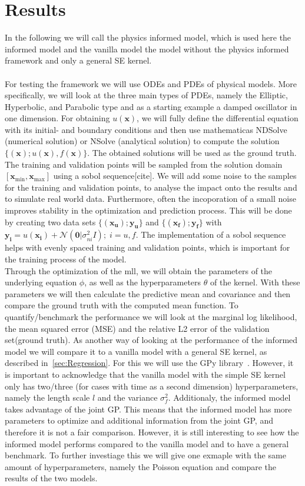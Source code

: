 \documentclass{article}
\begin{document}
\section{Results}
In the following we will call the physics informed model, which is used here the
informed model and the vanilla model the model without the physics informed
framework and only a general SE kernel.\\ \\ For testing the framework we will
use ODEs and PDEs of physical models. More specifically, we will look at the
three main types of PDEs, namely the Elliptic, Hyperbolic, and Parabolic type and as a starting example a damped oscillator in one dimension. For obtaining
$u(\bm{x})$, we will fully define the differential equation with its initial-
and boundary conditions and then use mathematicas NDSolve (numerical solution)
or NSolve (analytical solution) to compute the solution
$\{(\bm{x});u(\bm{x}),f(\bm{x})\}$. The obtained solutions will be used as the ground truth.
The training and validation points will be sampled from the solution domain $[\bm{x}_{\min}, \bm{x}_{\max}]$ using a sobol
sequence[cite]. We will add some noise to the samples for the training and
validation points, to analyse the impact onto the results and to simulate real
world data. Furthermore, often the incoporation of a small noise improves stability in
the optimization and prediction process. This will be done by creating two data
sets $\{(\bm{x_u});\bm{y_u}\}$ and $\{(\bm{x_f});\bm{y_f}\}$ with $\bm{y_i} =
    u(\bm{x_i}) + \mathcal{N}(\bm{0}|\sigma_{ni}^2 I) ; \; i = u,f$. The
implementation of a sobol sequence helps with evenly spaced training and
validation points, which is important for the training process of the model.\\
Through the optimization of the mll, we will obtain the parameters of the
underlying equation $\phi$, as well as the hyperparameters $\theta$ of the
kernel. With these parameters we will then calculate the predictive mean and
covariance and then compare the ground truth with the computed mean function.
To quantify/benchmark the performance we will look at the marginal log likelihood, the mean squared error (MSE) and the relative L2 error of the validation set(ground truth). As another
way of looking at the performance of the informed model we will compare it to a
vanilla model with a general SE kernel, as described in~\ref{sec:Regression}.
For this we will use the GPy library~\cite{gpy2014}. However, it is important
to acknowledge that the vanilla model with the simple SE kernel only has two/three (for cases with time as a second dimension) hyperparameters, namely the length scale $l$ and the variance $\sigma_f^2$.
Additionaly, the informed model takes advantage of the joint GP. This means
that the informed model has more parameters to optimize and additional
information from the joint GP, and therefore it is not a fair comparison.
However, it is still interesting to see how the informed model performs
compared to the vanilla model and to have a general benchmark. To further
investiage this we will give one exmaple with the same amount of
hyperparameters, namely the Poisson equation and compare the results of the two
models.\\
\end{document}
